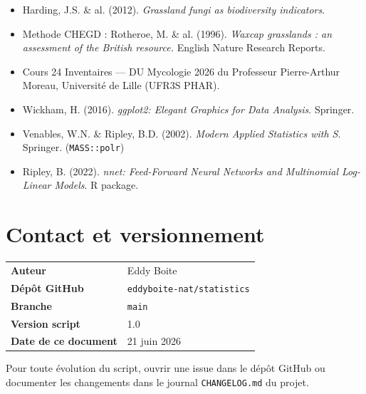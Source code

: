 \documentclass[11pt,a4paper]{article}
\begin{document}
\begin{itemize}
  \item Harding, J.S. \& al. (2012). \textit{Grassland fungi as biodiversity indicators}.
  \item Methode CHEGD : Rotheroe, M. \& al. (1996). \textit{Waxcap grasslands : an assessment of the British resource.} English Nature Research Reports.
  \item Cours 24 Inventaires — DU Mycologie 2026 du Professeur Pierre-Arthur Moreau, Université de Lille (UFR3S PHAR).
  \item Wickham, H. (2016). \textit{ggplot2: Elegant Graphics for Data Analysis}. Springer.
  \item Venables, W.N. \& Ripley, B.D. (2002). \textit{Modern Applied Statistics with S}. Springer. (\texttt{MASS::polr})
  \item Ripley, B. (2022). \textit{nnet: Feed-Forward Neural Networks and Multinomial Log-Linear Models}. R package.
\end{itemize}

\section*{Contact et versionnement}

\begin{table}[htbp]
  \centering
  \begin{tabular}{ll}
    \toprule
    \textbf{Auteur}          & Eddy Boite \\
    \textbf{Dépôt GitHub}    & \texttt{eddyboite-nat/statistics} \\
    \textbf{Branche}         & \texttt{main} \\
    \textbf{Version script}  & 1.0 \\
    \textbf{Date de ce document} & 21 juin 2026 \\
    \bottomrule
  \end{tabular}
\end{table}

Pour toute évolution du script, ouvrir une issue dans le dépôt GitHub
ou documenter les changements dans le journal \texttt{CHANGELOG.md} du projet.

\end{document}
